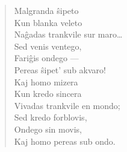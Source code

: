 \begin{verse}
                      \vin     Malgranda \^sipeto\\
                       \vin    Kun blanka veleto\\
                      Na\^gadas trankvile sur maro\dots\\
                       \vin    Sed venis ventego,\\
                       \vin    Fari\^gis ondego ---\\
                      Pereas \^sipet' sub akvaro!\\
                       \vin    Kaj homo mizera\\
                        \vin   Kun kredo sincera\\
                      Vivadas trankvile en mondo;\\
                        \vin   Sed kredo forblovis,\\
                       \vin    Ondego sin movis,\\
                      Kaj homo pereas sub ondo.

\end{verse}


\smallrule{}